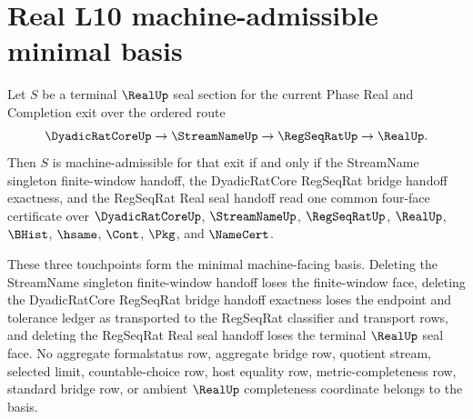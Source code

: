 \section{Real L10 machine-admissible minimal basis}
\label{sec:real-l10-machine-admissible-minimal-basis}

\begin{theorem}
\label{thm:real-l10-machine-admissible-minimal-basis}
Let $S$ be a terminal $\RealUp$ seal section for the current Phase Real and Completion exit over the ordered route
$$
\DyadicRatCoreUp \to \StreamNameUp \to \RegSeqRatUp \to \RealUp .
$$
Then $S$ is machine-admissible for that exit if and only if the StreamName singleton finite-window handoff, the DyadicRatCore RegSeqRat bridge handoff exactness, and the RegSeqRat Real seal handoff read one common four-face certificate over $\DyadicRatCoreUp$, $\StreamNameUp$, $\RegSeqRatUp$, $\RealUp$, $\BHist$, $\hsame$, $\Cont$, $\Pkg$, and $\NameCert$.

These three touchpoints form the minimal machine-facing basis. Deleting the StreamName singleton finite-window handoff loses the finite-window face, deleting the DyadicRatCore RegSeqRat bridge handoff exactness loses the endpoint and tolerance ledger as transported to the RegSeqRat classifier and transport rows, and deleting the RegSeqRat Real seal handoff loses the terminal $\RealUp$ seal face. No aggregate formalstatus row, aggregate bridge row, quotient stream, selected limit, countable-choice row, host equality row, metric-completeness row, standard bridge row, or ambient $\RealUp$ completeness coordinate belongs to the basis.
\end{theorem}
